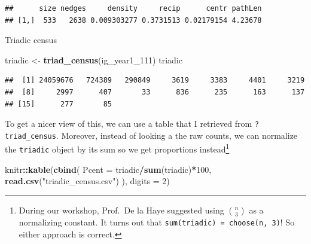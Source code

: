\documentclass[]{book}
\newenvironment{Shaded}{\begin{snugshade}}{\end{snugshade}}
\newcommand{\KeywordTok}[1]{\textcolor[rgb]{0.13,0.29,0.53}{\textbf{#1}}}
\newcommand{\DataTypeTok}[1]{\textcolor[rgb]{0.13,0.29,0.53}{#1}}
\newcommand{\DecValTok}[1]{\textcolor[rgb]{0.00,0.00,0.81}{#1}}
\newcommand{\StringTok}[1]{\textcolor[rgb]{0.31,0.60,0.02}{#1}}
\newcommand{\OperatorTok}[1]{\textcolor[rgb]{0.81,0.36,0.00}{\textbf{#1}}}
\newcommand{\NormalTok}[1]{#1}
\let\rmarkdownfootnote\footnote%
\def\footnote{\protect\rmarkdownfootnote}
\theoremstyle{definition}
\theoremstyle{definition}
\theoremstyle{definition}
\theoremstyle{remark}
\begin{document}
\begin{verbatim}
##      size nedges     density     recip      centr pathLen
## [1,]  533   2638 0.009303277 0.3731513 0.02179154 4.23678
\end{verbatim}

Triadic census

\begin{Shaded}
\begin{Highlighting}[]
\NormalTok{triadic <-}\StringTok{ }\KeywordTok{triad_census}\NormalTok{(ig_year1_}\DecValTok{111}\NormalTok{)}
\NormalTok{triadic}
\end{Highlighting}
\end{Shaded}

\begin{verbatim}
##  [1] 24059676   724389   290849     3619     3383     4401     3219
##  [8]     2997      407       33      836      235      163      137
## [15]      277       85
\end{verbatim}

To get a nicer view of this, we can use a table that I retrieved from
\texttt{?triad\_census}. Moreover, instead of looking a the raw counts,
we can normalize the \texttt{triadic} object by its sum so we get
proportions instead\footnote{During our workshop, Prof.~De la Haye
  suggested using \({n \choose 3}\) as a normalizing constant. It turns
  out that \texttt{sum(triadic)\ =\ choose(n,\ 3)}! So either approach
  is correct.}

\begin{Shaded}
\begin{Highlighting}[]
\NormalTok{knitr}\OperatorTok{::}\KeywordTok{kable}\NormalTok{(}\KeywordTok{cbind}\NormalTok{(}
  \DataTypeTok{Pcent =}\NormalTok{ triadic}\OperatorTok{/}\KeywordTok{sum}\NormalTok{(triadic)}\OperatorTok{*}\DecValTok{100}\NormalTok{,}
  \KeywordTok{read.csv}\NormalTok{(}\StringTok{"triadic_census.csv"}\NormalTok{)}
\NormalTok{  ), }\DataTypeTok{digits =} \DecValTok{2}\NormalTok{)}
\end{Highlighting}
\end{Shaded}
\end{document}
